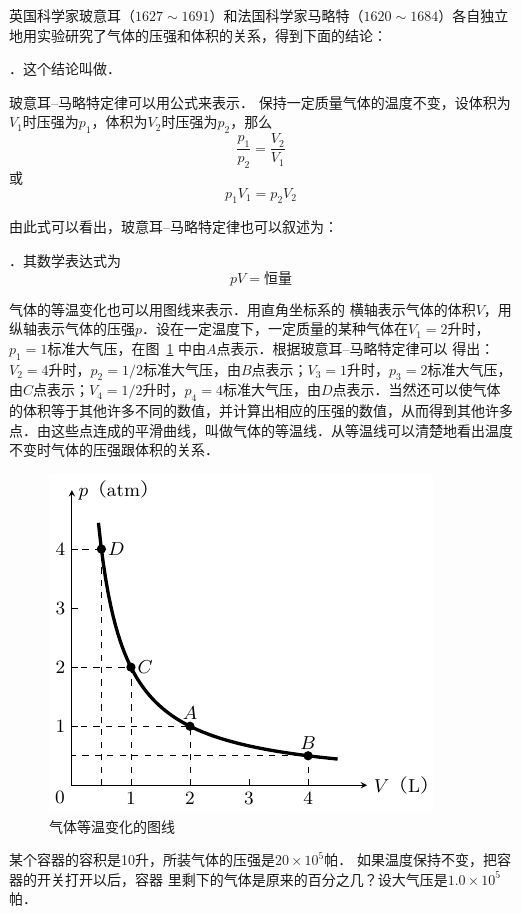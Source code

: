 英国科学家玻意耳（$1627 \sim 1691$）和法国科学家马略特（$1620 \sim 1684$）各自独立地用实验研究了气体的压强和体积的关系，得到下面的结论：

．这个结论叫做．

玻意耳--马略特定律可以用公式来表示．
保持一定质量气体的温度不变，设体积为$V_1$时压强为$p_1$，体积为$V_2$时压强为$p_2$，那么
\[\frac{p_1}{p_2}=\frac{V_2}{V_1} \]
或
\[p_1V_1=p_2V_2 \]

由此式可以看出，玻意耳--马略特定律也可以叙述为：

．其数学表达式为
\[pV=\text{恒量}\]

气体的等温变化也可以用图线来表示．用直角坐标系的
横轴表示气体的体积$V$，用纵轴表示气体的压强$p$．设在一定温度下，一定质量的某种气体在$V_1=2$升时，$p_1=1$标准大气压，在图~\ref{fig_B_3-6} 中由$A$点表示．根据玻意耳--马略特定律可以
得出：$V_2=4$升时，$p_2=1/2$标准大气压，由$B$点表示；$V_3=1$升时，$p_3=2$标准大气压，由$C$点表示；$V_4=1/2$升时，$p_4=4$标准大气压，由$D$点表示．当然还可以使气体的体积等于其他许多不同的数值，并计算出相应的压强的数值，从而得到其他许多点．由这些点连成的平滑曲线，叫做气体的等温线．从等温线可以清楚地看出温度不变时气体的压强跟体积的关系．
\begin{figure}[htbp]
    \centering
    \includegraphics{fig/B/3-6.pdf}
    \caption{气体等温变化的图线}\label{fig_B_3-6}
\end{figure}

\begin{example}
某个容器的容积是10升，所装气体的压强是$20\times 10^5$帕．
如果温度保持不变，把容器的开关打开以后，容器
里剩下的气体是原来的百分之几？设大气压是$1.0\times 10^5$帕．
\end{example}

